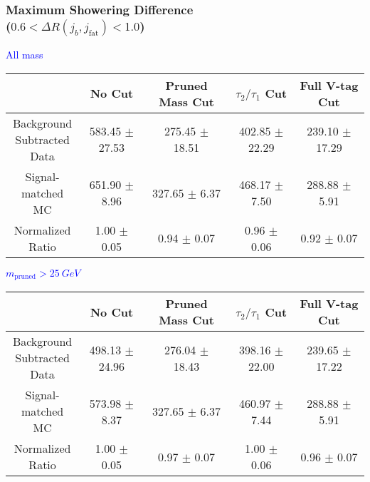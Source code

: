 \documentclass{beamer}
\begin{document}
\begin{frame}
  \frametitle{Maximum Showering Difference \\ ($0.6 < \Delta R(j_b,j_\text{fat}) < 1.0$)}
  \begin{adjustwidth}{-1.5em}{-1.5em}
    \centering
    \vspace{6pt}
    \textcolor{blue}{All mass}
    \vspace{6pt}

    {\scriptsize
      \begin{tabular}{c | c | c | c | c}
        \hline
        & No Cut & Pruned Mass Cut & $\tau_2/\tau_1$ Cut & Full V-tag Cut \\
        \hline
        \makecell{Background \\ Subtracted \\ Data} & 583.45 $\pm$ 27.53 & 275.45 $\pm$ 18.51 & 402.85 $\pm$ 22.29 & 239.10 $\pm$ 17.29 \\
        \makecell{Signal-\\ matched MC} & 651.90 $\pm$ 8.96 & 327.65 $\pm$ 6.37 & 468.17 $\pm$ 7.50 & 288.88 $\pm$ 5.91 \\
        \hline
        \makecell{Normalized \\ Ratio} & 1.00 $\pm$ 0.05 & 0.94 $\pm$ 0.07 & 0.96 $\pm$ 0.06 & 0.92 $\pm$ 0.07 \\
        \hline
      \end{tabular}
    }

    \vspace{6pt}
    \textcolor{blue}{$m_\text{pruned} > \SI{25}{GeV}$}
    \vspace{6pt}

    {\scriptsize
      \begin{tabular}{c | c | c | c | c}
        \hline
        & No Cut & Pruned Mass Cut & $\tau_2/\tau_1$ Cut & Full V-tag Cut \\
        \hline
        \makecell{Background \\ Subtracted \\ Data} & 498.13 $\pm$ 24.96 & 276.04 $\pm$ 18.43 & 398.16 $\pm$ 22.00 & 239.65 $\pm$ 17.22 \\
        \makecell{Signal-\\ matched MC} & 573.98 $\pm$ 8.37 & 327.65 $\pm$ 6.37 & 460.97 $\pm$ 7.44 & 288.88 $\pm$ 5.91 \\
        \hline
        \makecell{Normalized \\ Ratio} & 1.00 $\pm$ 0.05 & 0.97 $\pm$ 0.07 & 1.00 $\pm$ 0.06 & 0.96 $\pm$ 0.07 \\
        \hline
      \end{tabular}
    }
  \end{adjustwidth}
\end{frame}
\end{document}
